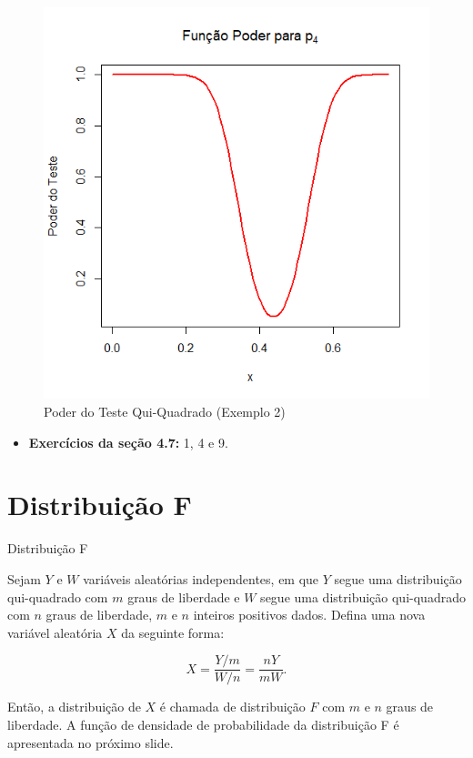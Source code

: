 \documentclass[12pt]{beamer}
\begin{document}
\begin{frame}{}
\begin{block}{}
\begin{figure}
    \centering
    \includegraphics[scale=0.5]{Aula13ChiSquareTests/figs/Ex2p4.png}
    \caption{Poder do Teste Qui-Quadrado (Exemplo 2)}
    \label{fig:enter-label}
\end{figure}
\end{block}
\end{frame}


\begin{frame}{\Home}
\begin{block}{}
\justifying

\begin{itemize}
    \item \textbf{Exercícios da seção 4.7:} 1, 4 e 9.
\end{itemize}
\nocite{hogg}
\end{block}
\end{frame}

\section{Distribuição F}
\begin{frame}{Distribuição F}
\begin{definicao}
\justifying
Sejam $Y$ e $W$ variáveis aleatórias independentes, em que $Y$ segue uma distribuição qui-quadrado com $m$ graus de liberdade e $W$ segue uma distribuição qui-quadrado com $n$ graus de liberdade, $m$ e $n$ inteiros positivos dados. Defina uma nova variável aleatória $X$ da seguinte forma:

\[
X = \dfrac{Y/m}{W/n} = \frac{nY}{mW}.
\]

Então, a distribuição de $X$ é chamada de distribuição $F$ com $m$ e $n$ graus de liberdade. A função de densidade de probabilidade da distribuição F é apresentada no próximo slide.
\end{definicao}
\end{frame}
\end{document}
